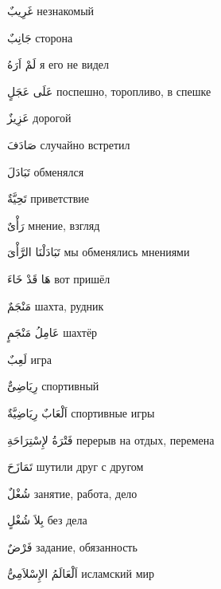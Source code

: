 \documentclass[a5paper]{article}
\newcommand\textstyleDropCaps[1]{#1}
\newcommand\textstyleCaptioncharacters[1]{#1}
\begin{document}
\textstyleCaptioncharacters{غَرِيبٌ }\textstyleDropCaps{незнакомый‎}

\textstyleCaptioncharacters{جَانِبٌ }\textstyleDropCaps{сторона‎}

\textstyleCaptioncharacters{لَمْ اَرَهُ }\textstyleDropCaps{я его не видел‎}

\textstyleCaptioncharacters{عَلَى عَجَلٍ }\textstyleDropCaps{поспешно, то­ропливо, в спешке‎}

\textstyleCaptioncharacters{عَزِيزٌ }\textstyleDropCaps{дорогой‎}

\textstyleCaptioncharacters{صَادَفَ }\textstyleDropCaps{случайно встретил‎}

\textstyleCaptioncharacters{تَبَادَلَ }\textstyleDropCaps{обменялся‎}

\textstyleCaptioncharacters{تَحِيَّةٌ }\textstyleDropCaps{приветствие‎}

\textstyleCaptioncharacters{رَأْىٌ }\textstyleDropCaps{мнение, взгляд‎}

\textstyleCaptioncharacters{تَبَادَلْنَا الرَّأْىَ }\textstyleDropCaps{мы обме­нялись мнениями‎}

\textstyleCaptioncharacters{هَا قَدْ خَاءَ }\textstyleDropCaps{вот пришёл‎}

\textstyleCaptioncharacters{مَنْجَمٌ }\textstyleDropCaps{шахта, рудник‎}

\textstyleCaptioncharacters{عَامِلُ مَنْجَمٍ }\textstyleDropCaps{шахтёр‎}

\textstyleCaptioncharacters{لَعِبٌ }\textstyleDropCaps{игра‎}

\textstyleCaptioncharacters{رِيَاضِىٌّ }\textstyleDropCaps{спортивный‎}

\textstyleCaptioncharacters{اَلْعَابٌ رِيَاضِيَّةٌ }\textstyleDropCaps{спортив­ные игры‎}

\textstyleCaptioncharacters{فَتْرَةُ لإِسْتِرَاحَةِ }\textstyleDropCaps{пере­рыв на отдых, перемена‎}

\textstyleCaptioncharacters{تَمَازَحَ }\textstyleDropCaps{шутили друг с дру­гом‎}

\textstyleCaptioncharacters{شُغْلٌ }\textstyleDropCaps{занятие, работа, дело‎}

\textstyleCaptioncharacters{بِلاَ شُغْلٍ }\textstyleDropCaps{без дела‎}

\textstyleCaptioncharacters{فَرْضٌ }\textstyleDropCaps{задание, обязан­ность‎}

\textstyleCaptioncharacters{اَلْعَالَمُ الإِسْلاَمِىُّ }\textstyleDropCaps{ислам­ский мир‎}
\end{document}
